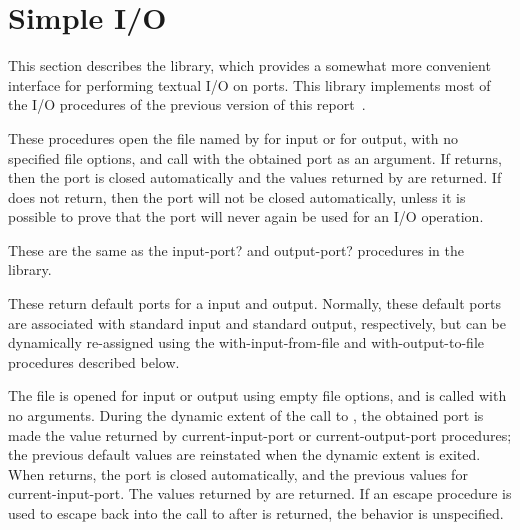\section{Simple I/O}
\label{simpleiosection}

This section describes the  library, which
provides a somewhat more convenient interface for performing textual
I/O on ports.  This library implements most of the 
I/O procedures of the previous version of this report~\cite{R5RS}.

\begin{entry}{%
}

These procedures open the file named by  for input or
for output, with no specified file options, and call  with
the obtained port as an argument.  If  returns, then the
port is closed automatically and the values returned by  are
returned. If  does not return, then the port will not be
closed automatically, unless it is possible to prove that the port
will never again be used for an I/O operation.
\end{entry}

\begin{entry}{%
}

These are the same as the {\cf input-port?} and {\cf output-port?}
procedures in the  library.
\end{entry}

\begin{entry}{%
}

These return default ports for a input and output.  Normally, these
default ports are associated with standard input and standard output,
respectively, but can be dynamically re-assigned using the {\cf
  with-input-from-file} and {\cf with-output-to-file} procedures
described below.
\end{entry}

\begin{entry}{%
}

  The
file is opened for input or output using empty file options, and
 is called with no arguments.  During the dynamic extent of
the call to , the obtained port is made the value returned
by {\cf current-input-port} or {\cf current-output-port} procedures;
the previous default values are reinstated when the dynamic extent is
exited.  When  returns, the port is closed automatically,
and the previous values for {\cf current-input-port}.  The values
returned by  are returned.  If an escape procedure is used
to escape back into the call to  after  is
returned, the behavior is unspecified.
\end{entry}

